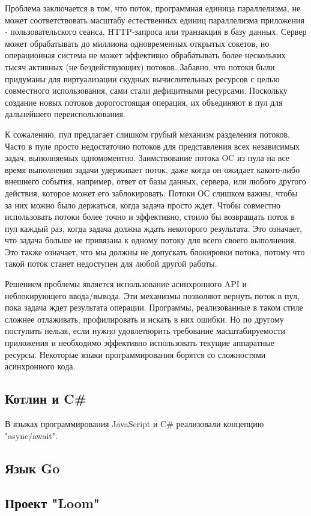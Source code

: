 	Проблема заключается в том, что поток, программная единица параллелизма, не может соответствовать масштабу
	естественных единиц параллелизма приложения - пользовательского сеанса, HTTP-запроса или транзакция в базу
	данных. Сервер может обрабатывать до миллиона одновременных открытых сокетов, но операционная система не
	может эффективно обрабатывать более нескольких тысяч активных (не бездействующих) потоков. 
	Забавно, что потоки были придуманы для виртуализации скудных вычислительных ресурсов с целью совместного
	использования, сами стали дефицитными ресурсами. Поскольку создание новых потоков дорогостоящая операция,
	их объединяют в пул для дальнейшего переиспользования. 
	
	К сожалению, пул предлагает слишком грубый механизм разделения потоков. Часто в пуле просто недостаточно
	потоков для представления всех независимых задач, выполняемых одномоментно. Заимствование потока OC из
	пула на все время выполнения задачи удерживает поток, даже когда он ожидает какого-либо внешнего события,
	например, ответ от базы данных, сервера, или любого другого действия, которое может его заблокировать.
	Потоки ОС слишком важны, чтобы за них можно было держаться, когда задача просто ждет. Чтобы совместно
	использовать потоки более точно и эффективно, стоило бы возвращать поток в пул каждый раз, когда задача
	должна ждать некоторого результата. Это означает, что задача больше не привязана к одному потоку для всего
	своего выполнения. Это также означает, что мы должны не допускать блокировки потока, потому что такой
	поток станет недоступен для любой другой работы.
	\par
	Решением проблемы является использование асинхронного API и неблокирующего ввода/вывода. Эти  механизмы
	позволяют вернуть поток в пул, пока задача ждет результата операции. Программы, реализованные в таком
	стиле сложнее отлаживать, профилировать и искать в них ошибки. Но по другому поступить нельзя, если нужно
	удовлетворить требование масштабируемости приложения и необходимо эффективно использовать текущие
	аппаратные ресурсы. Некоторые языки программирования борятся со сложностями асинхронного кода.
	
	\subsection{Котлин и C\#}
	В языках программирования JavaScript и C\# реализовали концепцию "async/await".
	
	\subsection{Язык Go}
	
	\subsection{Проект "Loom"}
	
	
\clearpage